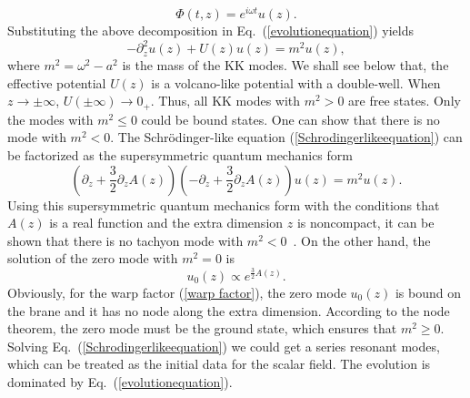\begin{equation}
\Phi(t,z)=e^{i\omega t}u(z).\label{decomposition2}
\end{equation}
Substituting the above decomposition in Eq.~(\ref{evolutionequation}) yields
\begin{equation}
-\partial_{z}^{2}u(z)+U(z)u(z)=m^{2}u(z),\label{Schrodingerlikeequation}
\end{equation}
where $m^2=\omega^2-a^2$ is the mass of the KK modes. We shall see below that, the effective potential $U(z)$ is a volcano-like potential with a double-well. When $z\rightarrow \pm\infty$, $U(\pm\infty)\rightarrow 0_{+}$. Thus, all KK modes with $m^{2}>0$ are free states. Only the modes with $m^{2}\leq0$ could be bound states. One can show that there is no mode with $m^{2}<0$. The Schr\"odinger-like equation (\ref{Schrodingerlikeequation}) can be factorized as the supersymmetric quantum mechanics form
\begin{equation}
\left(\partial_{z}+\frac{3}{2}\partial_{z}A(z)\right)\left(-\partial_{z}+
\frac{3}{2}\partial_{z}A(z)\right)u(z)=m^{2}u(z).
\end{equation}
Using this supersymmetric quantum mechanics form with the conditions that $A(z)$ is a real function and the extra dimension $z$ is noncompact, it can be shown that there is no tachyon mode with $m^{2}<0$~\cite{Yang:2017puy,Wan:2020smy}. On the other hand, the solution of the zero mode with $m^{2}=0$ is
\begin{equation}
u_{0}(z)\propto e^{\frac{3}{2}A(z)}.
\end{equation}
Obviously, for the warp factor (\ref{warp factor}), the zero mode $u_{0}(z)$ is bound on the brane and it has no node along the extra dimension. According to the node theorem, the zero mode must be the ground state, which ensures that $m^2\geq0$.
Solving Eq.~(\ref{Schrodingerlikeequation}) we could get a series resonant modes, which can be treated as the initial data for the scalar field. The evolution is dominated by Eq.~(\ref{evolutionequation}).



